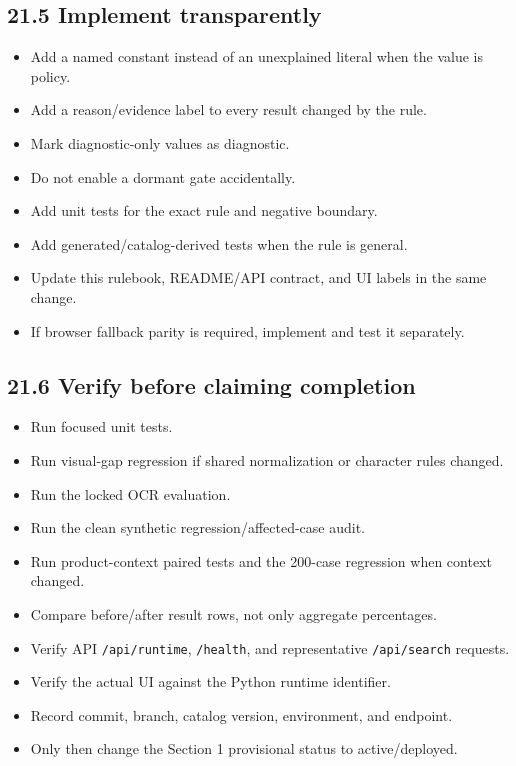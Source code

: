\subsection{21.5 Implement transparently}\label{215-implement-transparently}

\begin{itemize}
\tightlist
\item[$\square$]
  Add a named constant instead of an unexplained literal when the value is policy.
\item[$\square$]
  Add a reason/evidence label to every result changed by the rule.
\item[$\square$]
  Mark diagnostic-only values as diagnostic.
\item[$\square$]
  Do not enable a dormant gate accidentally.
\item[$\square$]
  Add unit tests for the exact rule and negative boundary.
\item[$\square$]
  Add generated/catalog-derived tests when the rule is general.
\item[$\square$]
  Update this rulebook, README/API contract, and UI labels in the same change.
\item[$\square$]
  If browser fallback parity is required, implement and test it separately.
\end{itemize}

\subsection{21.6 Verify before claiming completion}\label{216-verify-before-claiming-completion}

\begin{itemize}
\tightlist
\item[$\square$]
  Run focused unit tests.
\item[$\square$]
  Run visual-gap regression if shared normalization or character rules changed.
\item[$\square$]
  Run the locked OCR evaluation.
\item[$\square$]
  Run the clean synthetic regression/affected-case audit.
\item[$\square$]
  Run product-context paired tests and the 200-case regression when context changed.
\item[$\square$]
  Compare before/after result rows, not only aggregate percentages.
\item[$\square$]
  Verify API \texttt{/api/runtime}, \texttt{/health}, and representative \texttt{/api/search} requests.
\item[$\square$]
  Verify the actual UI against the Python runtime identifier.
\item[$\square$]
  Record commit, branch, catalog version, environment, and endpoint.
\item[$\square$]
  Only then change the Section 1 provisional status to active/deployed.
\end{itemize}

